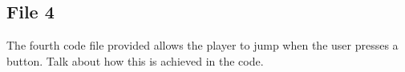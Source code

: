 \documentclass[12pt]{article}
\begin{document}
\newpage

\subsection*{File 4}
The fourth code file provided allows the player to jump when the user presses a button. Talk about how this is achieved in the code.
\end{document}
